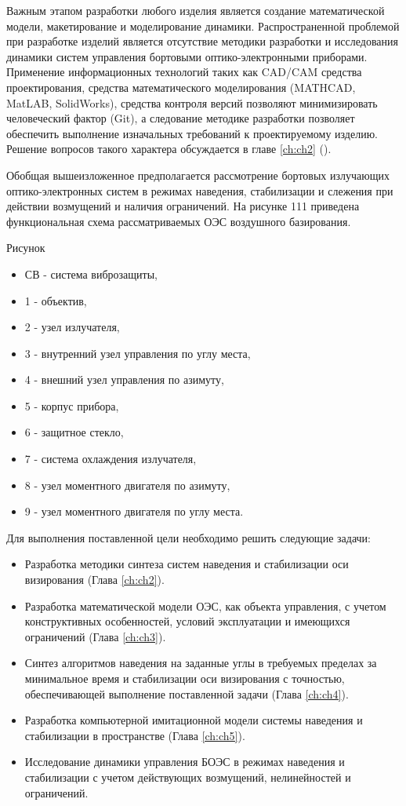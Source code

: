 Важным этапом разработки любого изделия является создание математической модели, макетирование и моделирование динамики. Распространенной проблемой при разработке изделий является отсутствие методики разработки и исследования динамики систем управления бортовыми оптико-электронными приборами. Применение информационных технологий таких как CAD/CAM средства проектирования, средства математического моделирования (MATHCAD, MatLAB, SolidWorks), средства контроля версий позволяют минимизировать человеческий фактор (Git), а следование методике разработки позволяет обеспечить выполнение изначальных требований к проектируемому изделию. Решение вопросов такого характера обсуждается в главе \ref{ch:ch2} ().

Обобщая вышеизложенное  предполагается  рассмотрение бортовых излучающих оптико-электронных систем в режимах наведения, стабилизации и слежения при действии возмущений и наличия  ограничений. На рисунке 111 приведена функциональная схема  рассматриваемых ОЭС воздушного базирования.

Рисунок

\begin{itemize}
	\item СВ - система виброзащиты,
	\item 1 - объектив,
	\item 2 - узел излучателя,
	\item 3 - внутренний узел управления по углу места,
	\item 4 - внешний узел управления по азимуту,
	\item 5 - корпус прибора,
	\item 6 - защитное стекло,
	\item 7 - система охлаждения излучателя,
	\item 8 - узел моментного двигателя по азимуту,
	\item 9 - узел моментного двигателя по углу места.
\end{itemize}

Для выполнения поставленной цели необходимо решить следующие задачи:

\begin{itemize}
	\item Разработка методики синтеза систем наведения и стабилизации оси визирования (Глава \ref{ch:ch2}).
	\item Разработка математической модели ОЭС, как объекта управления, с учетом конструктивных особенностей, условий эксплуатации и имеющихся ограничений (Глава \ref{ch:ch3}).
	\item Синтез алгоритмов наведения на заданные углы в требуемых пределах за минимальное время и стабилизации оси визирования с точностью, обеспечивающей выполнение поставленной задачи (Глава \ref{ch:ch4}).
	\item Разработка компьютерной имитационной модели системы наведения и стабилизации в пространстве (Глава \ref{ch:ch5}).
	\item Исследование динамики управления БОЭС в режимах наведения и стабилизации с учетом действующих возмущений, нелинейностей и ограничений.
\end{itemize}

\clearpage